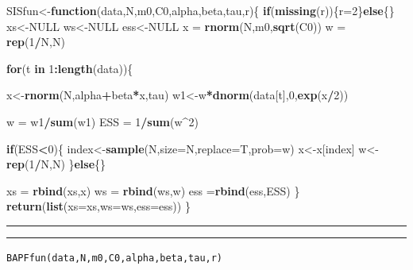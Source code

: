 \documentclass[
]{book}
\newenvironment{Shaded}{\begin{snugshade}}{\end{snugshade}}
\newcommand{\ControlFlowTok}[1]{\textcolor[rgb]{0.13,0.29,0.53}{\textbf{#1}}}
\newcommand{\DataTypeTok}[1]{\textcolor[rgb]{0.13,0.29,0.53}{#1}}
\newcommand{\DecValTok}[1]{\textcolor[rgb]{0.00,0.00,0.81}{#1}}
\newcommand{\KeywordTok}[1]{\textcolor[rgb]{0.13,0.29,0.53}{\textbf{#1}}}
\newcommand{\NormalTok}[1]{#1}
\newcommand{\OperatorTok}[1]{\textcolor[rgb]{0.81,0.36,0.00}{\textbf{#1}}}
\newcommand{\OtherTok}[1]{\textcolor[rgb]{0.56,0.35,0.01}{#1}}
\newcommand{\StringTok}[1]{\textcolor[rgb]{0.31,0.60,0.02}{#1}}
\theoremstyle{break}
\theoremstyle{nonumberplain}
\begin{document}
\begin{Shaded}
\begin{Highlighting}[]
\NormalTok{SISfun<-}\ControlFlowTok{function}\NormalTok{(data,N,m0,C0,alpha,beta,tau,r)\{}
  \ControlFlowTok{if}\NormalTok{(}\KeywordTok{missing}\NormalTok{(r))\{r=}\DecValTok{2}\NormalTok{\}}\ControlFlowTok{else}\NormalTok{\{\}}
\NormalTok{  xs<-}\OtherTok{NULL}
\NormalTok{  ws<-}\OtherTok{NULL}
\NormalTok{  ess<-}\OtherTok{NULL}
\NormalTok{  x  =}\StringTok{ }\KeywordTok{rnorm}\NormalTok{(N,m0,}\KeywordTok{sqrt}\NormalTok{(C0))}
\NormalTok{  w  =}\StringTok{ }\KeywordTok{rep}\NormalTok{(}\DecValTok{1}\OperatorTok{/}\NormalTok{N,N)}
  
  \ControlFlowTok{for}\NormalTok{(t }\ControlFlowTok{in} \DecValTok{1}\OperatorTok{:}\KeywordTok{length}\NormalTok{(data))\{}
    
\NormalTok{    x<-}\KeywordTok{rnorm}\NormalTok{(N,alpha}\OperatorTok{+}\NormalTok{beta}\OperatorTok{*}\NormalTok{x,tau)}
\NormalTok{    w1<-w}\OperatorTok{*}\KeywordTok{dnorm}\NormalTok{(data[t],}\DecValTok{0}\NormalTok{,}\KeywordTok{exp}\NormalTok{(x}\OperatorTok{/}\DecValTok{2}\NormalTok{))}
    
\NormalTok{    w =}\StringTok{ }\NormalTok{w1}\OperatorTok{/}\KeywordTok{sum}\NormalTok{(w1)}
\NormalTok{    ESS  =}\StringTok{ }\DecValTok{1}\OperatorTok{/}\KeywordTok{sum}\NormalTok{(w}\OperatorTok{^}\DecValTok{2}\NormalTok{)}
    
    \ControlFlowTok{if}\NormalTok{(ESS}\OperatorTok{<}\DecValTok{0}\NormalTok{)\{}
\NormalTok{      index<-}\KeywordTok{sample}\NormalTok{(N,}\DataTypeTok{size=}\NormalTok{N,}\DataTypeTok{replace=}\NormalTok{T,}\DataTypeTok{prob=}\NormalTok{w)}
\NormalTok{      x<-x[index]}
\NormalTok{      w<-}\KeywordTok{rep}\NormalTok{(}\DecValTok{1}\OperatorTok{/}\NormalTok{N,N)}
\NormalTok{    \}}\ControlFlowTok{else}\NormalTok{\{\}}
    
\NormalTok{    xs =}\StringTok{ }\KeywordTok{rbind}\NormalTok{(xs,x)}
\NormalTok{    ws =}\StringTok{ }\KeywordTok{rbind}\NormalTok{(ws,w)}
\NormalTok{    ess =}\KeywordTok{rbind}\NormalTok{(ess,ESS)}
\NormalTok{  \}}
  \KeywordTok{return}\NormalTok{(}\KeywordTok{list}\NormalTok{(}\DataTypeTok{xs=}\NormalTok{xs,}\DataTypeTok{ws=}\NormalTok{ws,}\DataTypeTok{ess=}\NormalTok{ess))}
\NormalTok{\}}
\end{Highlighting}
\end{Shaded}

\hrule
\hrule

\texttt{BAPFfun(data,N,m0,C0,alpha,beta,tau,r)}\\
\end{document}
